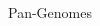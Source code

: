 \documentclass[dvipsnames]{beamer}
\begin{document}
\begin{frame}[fragile]{Pan-Genomes}
\begin{columns}
    \begin{column}{0.5\textwidth}
        \begin{figure}[htb!]
            \autocite{pang}
        \end{figure}
    \end{column}
    \begin{column}{0.5\textwidth}
        \begin{figure}[htb!]
            \autocite{ecopan}
        \end{figure}
    \end{column}
\end{columns}
\end{frame}
\end{document}
